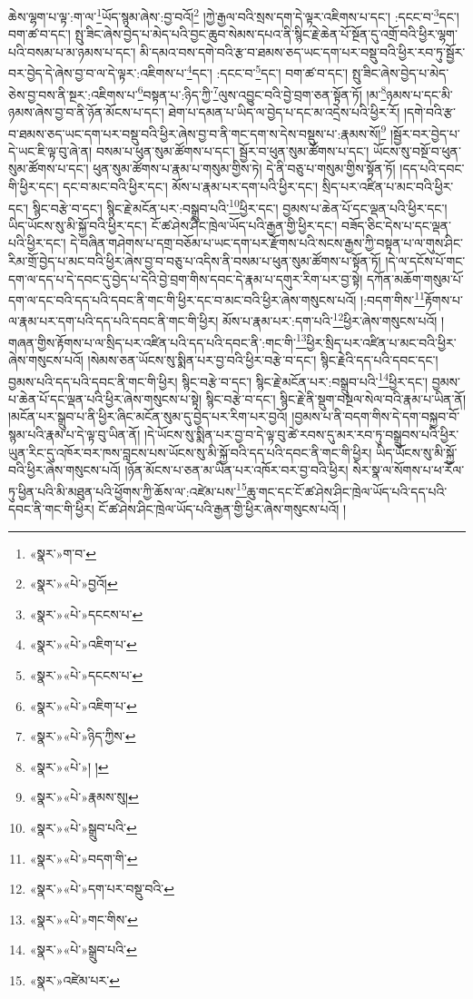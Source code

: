 ཆེས་ལྷག་པ་ལྟ་:ག་ལ་\footnote{«སྣར་»ག་བ་}ཡོད་སྙམ་ཞེས་:བྱ་བའོ།\footnote{«སྣར་»«པེ་»བྱའོ།} །ཀྱེ་རྒྱལ་བའི་སྲས་དག་དེ་ལྟར་འཇིགས་པ་དང་། :དངང་བ་\footnote{«སྣར་»«པེ་»དངངས་པ་}དང་། བག་ཚ་བ་དང་། སྤུ་ཟིང་ཞེས་བྱེད་པ་མེད་པའི་བྱང་ཆུབ་སེམས་དཔའ་ནི་སྙིང་རྗེ་ཆེན་པོ་སྔོན་དུ་འགྲོ་བའི་ཕྱིར་ལྷག་པའི་བསམ་པ་མ་ཉམས་པ་དང་། མི་དམའ་བས་དགེ་བའི་རྩ་བ་ཐམས་ཅད་ཡང་དག་པར་བསྡུ་བའི་ཕྱིར་རབ་ཏུ་སྦྱོར་བར་བྱེད་དེ་ཞེས་བྱ་བ་ལ་དེ་ལྟར་:འཇིགས་པ་\footnote{«སྣར་»«པེ་»འཇིག་པ་}དང་། :དངང་བ་\footnote{«སྣར་»«པེ་»དངངས་པ་}དང་། བག་ཚ་བ་དང་། སྤུ་ཟིང་ཞེས་བྱེད་པ་མེད་ཅེས་བྱ་བས་ནི་སྔར་:འཇིགས་པ་\footnote{«སྣར་»«པེ་»འཇིག་པ་}བསྟན་པ་:ཉིད་ཀྱི་\footnote{«སྣར་»«པེ་»ཉིད་ཀྱིས་}ལུས་འབྱུང་བའི་བྱེ་བྲག་ཅན་སྟོན་ཏོ། །མ་\footnote{«སྣར་»«པེ་»། །}ཉམས་པ་དང་མི་ཉམས་ཞེས་བྱ་བ་ནི་ཉོན་མོངས་པ་དང་། ཐེག་པ་དམན་པ་ཡིད་ལ་བྱེད་པ་དང་མ་འདྲེས་པའི་ཕྱིར་རོ། །དགེ་བའི་རྩ་བ་ཐམས་ཅད་ཡང་དག་པར་བསྡུ་བའི་ཕྱིར་ཞེས་བྱ་བ་ནི་གང་དག་ས་དེས་བསྡུས་པ་:རྣམས་སོ།\footnote{«སྣར་»«པེ་»རྣམས་སུ།} །སྦྱོར་བར་བྱེད་པ་དེ་ཡང་ཇི་ལྟ་བུ་ཞེ་ན། བསམ་པ་ཕུན་སུམ་ཚོགས་པ་དང་། སྦྱོར་བ་ཕུན་སུམ་ཚོགས་པ་དང་། ཡོངས་སུ་བསྔོ་བ་ཕུན་སུམ་ཚོགས་པ་དང་། ཕུན་སུམ་ཚོགས་པ་རྣམ་པ་གསུམ་གྱིས་ཏེ། དེ་ནི་བཅུ་པ་གསུམ་གྱིས་སྟོན་ཏོ། །དད་པའི་དབང་གི་ཕྱིར་དང་། དང་བ་མང་བའི་ཕྱིར་དང་། མོས་པ་རྣམ་པར་དག་པའི་ཕྱིར་དང་། སྲིད་པར་འཛིན་པ་མང་བའི་ཕྱིར་དང་། སྙིང་བརྩེ་བ་དང་། སྙིང་རྗེ་མངོན་པར་:བསྒྲུབ་པའི་\footnote{«སྣར་»«པེ་»སྒྲུབ་པའི་}ཕྱིར་དང་། བྱམས་པ་ཆེན་པོ་དང་ལྡན་པའི་ཕྱིར་དང་། ཡིད་ཡོངས་སུ་མི་སྐྱོ་བའི་ཕྱིར་དང་། ངོ་ཚ་ཤེས་ཤིང་ཁྲེལ་ཡོད་པའི་རྒྱན་གྱི་ཕྱིར་དང་། བཟོད་ཅིང་དེས་པ་དང་ལྡན་པའི་ཕྱིར་དང་། དེ་བཞིན་གཤེགས་པ་དགྲ་བཅོམ་པ་ཡང་དག་པར་རྫོགས་པའི་སངས་རྒྱས་ཀྱི་བསྟན་པ་ལ་གུས་ཤིང་རིམ་གྲོ་བྱེད་པ་མང་བའི་ཕྱིར་ཞེས་བྱ་བ་བཅུ་པ་འདིས་ནི་བསམ་པ་ཕུན་སུམ་ཚོགས་པ་སྟོན་ཏོ། །དེ་ལ་དངོས་པོ་གང་དག་ལ་དད་པ་དེ་དབང་དུ་བྱེད་པ་དེའི་བྱེ་བྲག་གིས་དབང་དེ་རྣམ་པ་དགུར་རིག་པར་བྱ་སྟེ། དཀོན་མཆོག་གསུམ་པོ་དག་ལ་དང་བའི་དད་པའི་དབང་ནི་གང་གི་ཕྱིར་དང་བ་མང་བའི་ཕྱིར་ཞེས་གསུངས་པའོ། །:བདག་གིས་\footnote{«སྣར་»«པེ་»བདག་གི་}རྟོགས་པ་ལ་རྣམ་པར་དག་པའི་དད་པའི་དབང་ནི་གང་གི་ཕྱིར། མོས་པ་རྣམ་པར་:དག་པའི་\footnote{«སྣར་»«པེ་»དག་པར་བསྡུ་བའི་}ཕྱིར་ཞེས་གསུངས་པའོ། །གཞན་གྱིས་རྟོགས་པ་ལ་སྲིད་པར་འཛིན་པའི་དད་པའི་དབང་ནི་:གང་གི་\footnote{«སྣར་»«པེ་»གང་གིས་}ཕྱིར་སྲིད་པར་འཛིན་པ་མང་བའི་ཕྱིར་ཞེས་གསུངས་པའོ། །སེམས་ཅན་ཡོངས་སུ་སྨིན་པར་བྱ་བའི་ཕྱིར་བརྩེ་བ་དང་། སྙིང་རྗེའི་དད་པའི་དབང་དང་། བྱམས་པའི་དད་པའི་དབང་ནི་གང་གི་ཕྱིར། སྙིང་བརྩེ་བ་དང་། སྙིང་རྗེ་མངོན་པར་:བསྒྲུབ་པའི་\footnote{«སྣར་»«པེ་»སྒྲུབ་པའི་}ཕྱིར་དང་། བྱམས་པ་ཆེན་པོ་དང་ལྡན་པའི་ཕྱིར་ཞེས་གསུངས་པ་སྟེ། སྙིང་བརྩེ་བ་དང་། སྙིང་རྗེ་ནི་སྡུག་བསྔལ་སེལ་བའི་རྣམ་པ་ཡིན་ནོ། །མངོན་པར་སྒྲུབ་པ་ནི་ཕྱིར་ཞིང་མངོན་སུམ་དུ་བྱེད་པར་རིག་པར་བྱའོ། །བྱམས་པ་ནི་བདག་གིས་དེ་དག་བསྐྱབ་བོ་སྙམ་པའི་རྣམ་པ་དེ་ལྟ་བུ་ཡིན་ནོ། །དེ་ཡོངས་སུ་སྨིན་པར་བྱ་བ་དེ་ལྟ་བུ་ཚེ་རབས་དུ་མར་རབ་ཏུ་བསྒྲུབས་པའི་ཕྱིར་ཡུན་རིང་དུ་འཁོར་བར་ཁས་བླངས་པས་ཡོངས་སུ་མི་སྐྱོ་བའི་དད་པའི་དབང་ནི་གང་གི་ཕྱིར། ཡིད་ཡོངས་སུ་མི་སྐྱོ་བའི་ཕྱིར་ཞེས་གསུངས་པའོ། །ཉོན་མོངས་པ་ཅན་མ་ཡིན་པར་འཁོར་བར་བྱ་བའི་ཕྱིར། སེར་སྣ་ལ་སོགས་པ་ཕ་རོལ་ཏུ་ཕྱིན་པའི་མི་མཐུན་པའི་ཕྱོགས་ཀྱི་ཆོས་ལ་:འཛེམ་པས་\footnote{«སྣར་»འཛེམ་པར་}ཆུ་གང་དང་ངོ་ཚ་ཤེས་ཤིང་ཁྲེལ་ཡོད་པའི་དད་པའི་དབང་ནི་གང་གི་ཕྱིར། ངོ་ཚ་ཤེས་ཤིང་ཁྲེལ་ཡོད་པའི་རྒྱན་གྱི་ཕྱིར་ཞེས་གསུངས་པའོ། །
